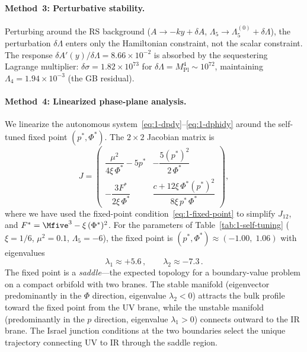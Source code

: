 \paragraph{Method~3: Perturbative stability.} Perturbing around the RS background ($A \to -ky + \delta A$, $\Lambda_5 \to \Lambda_5^{(0)} + \delta\Lambda$), the perturbation $\delta\Lambda$ enters only the Hamiltonian constraint, not the scalar constraint. The response $\delta A'(y)/\delta\Lambda = 8.66 \times 10^{-2}$ is absorbed by the sequestering Lagrange multiplier: $\delta\sigma = 1.82 \times 10^{73}$ for $\delta\Lambda = M_{\mathrm{Pl}}^4 \sim 10^{72}$, maintaining $\Lambda_4 = 1.94 \times 10^{-3}$ (the GB residual).

\paragraph{Method~4: Linearized phase-plane analysis.} We linearize the autonomous system~\eqref{eq:1-dpdy}--\eqref{eq:1-dphidy} around the self-tuned fixed point $(p^*, \Phi^*)$. The $2 \times 2$ Jacobian matrix is
\begin{equation}
\label{eq:1-jacobian}
J = \begin{pmatrix}
\dfrac{\mu^2}{4\xi\,\Phi^*} - 5p^* & -\dfrac{5(p^*)^2}{2\,\Phi^*} \\[10pt]
-\dfrac{3F^*}{2\xi\,\Phi^*} & \dfrac{c + 12\xi\,\Phi^*(p^*)^2}{8\xi\, p^*\, \Phi^*}
\end{pmatrix},
\end{equation}
where we have used the fixed-point condition~\eqref{eq:1-fixed-point} to simplify $J_{12}$, and $F^* = \Mfive^3 - \xi\,(\Phi^*)^2$. For the parameters of Table~\ref{tab:1-self-tuning} ($\xi = 1/6$, $\mu^2 = 0.1$, $\Lambda_5 = -6$), the fixed point is $(p^*, \Phi^*) \approx (-1.00,\; 1.06)$ with eigenvalues
\begin{equation}
\label{eq:1-eigenvalues}
\lambda_1 \approx +5.6\,, \qquad \lambda_2 \approx -7.3\,.
\end{equation}
The fixed point is a \emph{saddle}---the expected topology for a boundary-value problem on a compact orbifold with two branes. The stable manifold (eigenvector predominantly in the $\Phi$ direction, eigenvalue $\lambda_2 < 0$) attracts the bulk profile toward the fixed point from the UV brane, while the unstable manifold (predominantly in the $p$ direction, eigenvalue $\lambda_1 > 0$) connects outward to the IR brane. The Israel junction conditions at the two boundaries select the unique trajectory connecting UV to IR through the saddle region.


